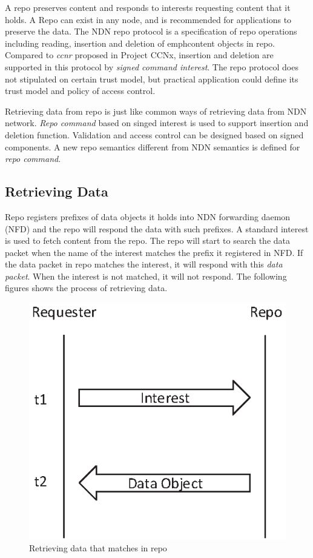 \documentclass{acm_proc_article-sp}
\begin{document}
A repo preserves content and responds to interests requesting content that it holds. A Repo can exist in any node, and is recommended for applications to preserve the data. The NDN repo protocol is a specification of repo operations including reading, insertion and deletion of emph{content objects} in repo. Compared to \emph{ccnr} proposed in Project CCNx, insertion and deletion are supported in this protocol by \emph{signed command interest}. The repo protocol does not stipulated on certain trust model, but practical application could define its trust model and policy of access control.

Retrieving data from repo is just like common ways of retrieving data from NDN network. \emph{Repo command} based on singed interest is used to support insertion and deletion function. Validation and access control can be designed based on signed components. A new repo semantics different from NDN semantics is defined for \emph{repo command}.

\subsection{Retrieving Data}

Repo registers prefixes of data objects it holds into NDN forwarding daemon (NFD) and the repo will respond the data with such prefixes. A standard interest is used to fetch content from the repo. The repo will start to search the data packet when the name of the interest matches the prefix it registered in NFD. If the data packet in repo matches the interest, it will respond with this \emph{data packet}. When the interest is not matched, it will not respond. The following figures shows the process of retrieving data.

\begin{figure}
\centering
\includegraphics{Drawing1.eps}
\caption{Retrieving data that matches in repo}
\end{figure}
\end{document}
